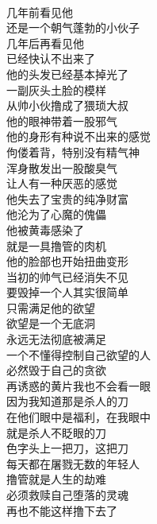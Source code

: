 \begin{poem}[撸劫]
    \begin{multicols}{2}
        \begin{center}~\\
            几年前看见他 \\ 还是一个朝气蓬勃的小伙子 \\ 几年后再看见他 \\ 已经快认不出来了 \\ 他的头发已经基本掉光了 \\ 一副灰头土脸的模样 \\ 从帅小伙撸成了猥琐大叔 \\ 他的眼神带着一股邪气 \\ 他的身形有种说不出来的感觉 \\ 佝偻着背，特别没有精气神 \\ 浑身散发出一股酸臭气 \\ 让人有一种厌恶的感觉 \\ 他失去了宝贵的纯净财富 \\ 他沦为了心魔的傀儡 \\ 他被黄毒感染了 \\ 就是一具撸管的肉机 \\ 他的脸部也开始扭曲变形 \\ 当初的帅气已经消失不见 \\ 要毁掉一个人其实很简单 \\ 只需满足他的欲望 \\ 欲望是一个无底洞 \\ 永远无法彻底被满足 \\ 一个不懂得控制自己欲望的人 \\ 必然毁于自己的贪欲 \\ 再诱惑的黄片我也不会看一眼 \\ 因为我知道那是杀人的刀 \\ 在他们眼中是福利，在我眼中 \\ 就是杀人不眨眼的刀 \\ 色字头上一把刀，这把刀 \\ 每天都在屠戮无数的年轻人 \\ 撸管就是人生的劫难 \\ 必须救赎自己堕落的灵魂 \\ 再也不能这样撸下去了
        \end{center}
    \end{multicols}
\end{poem}

